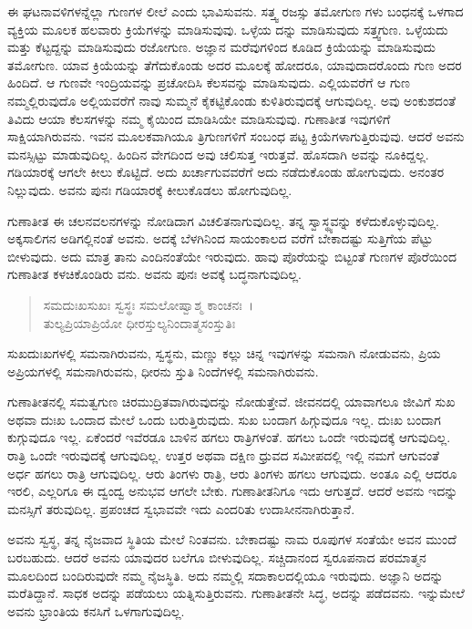 ಈ ಘಟನಾವಳಿಗಳನ್ನೆಲ್ಲಾ ಗುಣಗಳ ಲೀಲೆ ಎಂದು ಭಾವಿಸುವನು. ಸತ್ತ್ವ ರಜಸ್ಸು ತಮೋಗುಣ ಗಳು ಬಂಧನಕ್ಕೆ ಒಳಗಾದ ವ್ಯಕ್ತಿಯ ಮೂಲಕ ಹಲವಾರು ಕ್ರಿಯೆಗಳನ್ನು ಮಾಡಿಸುವುವು. ಒಳ್ಳೆಯ ದನ್ನು ಮಾಡಿಸುವುದು ಸತ್ತ್ವಗುಣ. ಒಳ್ಳೆಯದು ಮತ್ತು ಕೆಟ್ಟದ್ದನ್ನು ಮಾಡಿಸುವುದು ರಜೋಗುಣ. ಅಜ್ಞಾನ ಮರೆವುಗಳಿಂದ ಕೂಡಿದ ಕ್ರಿಯೆಯನ್ನು ಮಾಡಿಸುವುದು ತಮೋಗುಣ. ಯಾವ ಕ್ರಿಯೆಯನ್ನು ತೆಗೆದುಕೊಂಡು ಅದರ ಮೂಲಕ್ಕೆ ಹೋದರೂ, ಯಾವುದಾದರೊಂದು ಗುಣ ಅದರ ಹಿಂದಿದೆ. ಆ ಗುಣವೇ ಇಂದ್ರಿಯವನ್ನು ಪ್ರಚೋದಿಸಿ ಕೆಲಸವನ್ನು ಮಾಡಿಸುವುದು. ಎಲ್ಲಿಯವರೆಗೆ ಆ ಗುಣ ನಮ್ಮಲ್ಲಿರುವುದೊ ಅಲ್ಲಿಯವರೆಗೆ ನಾವು ಸುಮ್ಮನೆ ಕೈಕಟ್ಟಿಕೊಂಡು ಕುಳಿತಿರುವುದಕ್ಕೆ ಆಗುವುದಿಲ್ಲ. ಅವು ಅಂಕುಶದಂತೆ ತಿವಿದು ಆಯಾ ಕೆಲಸಗಳನ್ನು ನಮ್ಮ ಕೈಯಿಂದ ಮಾಡಿಸಿಯೇ ಮಾಡಿಸುವುವು. ಗುಣಾತೀತ ಇವುಗಳಿಗೆ ಸಾಕ್ಷಿಯಾಗಿರುವನು. ಇವನ ಮೂಲಕವಾಗಿಯೂ ತ್ರಿಗುಣಗಳಿಗೆ ಸಂಬಂಧ ಪಟ್ಟ ಕ್ರಿಯೆಗಳಾಗುತ್ತಿರುವುವು. ಆದರೆ ಅವನು ಮನಸ್ಸಿಟ್ಟು ಮಾಡುವುದಿಲ್ಲ. ಹಿಂದಿನ ವೇಗದಿಂದ ಅವು ಚಲಿಸುತ್ತ ಇರುತ್ತವೆ. ಹೊಸದಾಗಿ ಅವನ್ನು ನೂಕಿದ್ದಲ್ಲ. ಗಡಿಯಾರಕ್ಕೆ ಆಗಲೇ ಕೀಲು ಕೊಟ್ಟಿದೆ. ಅದು ಖರ್ಚಾಗುವವರೆಗೆ ಅದು ನಡೆದುಕೊಂಡು ಹೋಗುವುದು. ಅನಂತರ ನಿಲ್ಲುವುದು. ಅವನು ಪುನಃ ಗಡಿಯಾರಕ್ಕೆ ಕೀಲುಕೊಡಲು ಹೋಗುವುದಿಲ್ಲ.

ಗುಣಾತೀತ ಈ ಚಲನವಲನಗಳನ್ನು ನೋಡಿದಾಗ ವಿಚಲಿತನಾಗುವುದಿಲ್ಲ. ತನ್ನ ಸ್ವಾಸ್ಥ್ಯವನ್ನು ಕಳೆದುಕೊಳ್ಳುವುದಿಲ್ಲ. ಅಕ್ಕಸಾಲಿಗನ ಅಡಿಗಲ್ಲಿನಂತೆ ಅವನು. ಅದಕ್ಕೆ ಬೆಳಗಿನಿಂದ ಸಾಯಂಕಾಲದ ವರೆಗೆ ಬೇಕಾದಷ್ಟು ಸುತ್ತಿಗೆಯ ಪೆಟ್ಟು ಬೀಳುವುದು. ಅದು ಮಾತ್ರ ತಾನು ಎಂದಿನಂತೆಯೇ ಇರುವುದು. ಹಾವು ಪೊರೆಯನ್ನು ಬಿಟ್ಟಂತೆ ಗುಣಗಳ ಪೊರೆಯಿಂದ ಗುಣಾತೀತ ಕಳಚಿಕೊಂಡಿರು ವನು. ಅವನು ಪುನಃ ಅವಕ್ಕೆ ಬದ್ಧನಾಗುವುದಿಲ್ಲ.

\begin{verse}
ಸಮದುಃಖಸುಖಃ ಸ್ವಸ್ಥಃ ಸಮಲೋಷ್ವಾಶ್ಮ ಕಾಂಚನಃ~।\\ತುಲ್ಯಪ್ರಿಯಾಪ್ರಿಯೋ ಧೀರಸ್ತುಲ್ಯನಿಂದಾತ್ಮಸಂಸ್ತುತಿಃ 
\end{verse}

{\small ಸುಖದುಃಖಗಳಲ್ಲಿ ಸಮನಾಗಿರುವನು, ಸ್ವಸ್ಥನು, ಮಣ್ಣು ಕಲ್ಲು ಚಿನ್ನ ಇವುಗಳನ್ನು ಸಮನಾಗಿ ನೋಡುವನು, ಪ್ರಿಯ ಅಪ್ರಿಯಗಳಲ್ಲಿ ಸಮನಾಗಿರುವನು, ಧೀರನು ಸ್ತುತಿ ನಿಂದೆಗಳಲ್ಲಿ ಸಮನಾಗಿರುವನು.}

ಗುಣಾತೀತನಲ್ಲಿ ಸಮತ್ವಗುಣ ಚಿರಮುದ್ರಿತವಾಗಿರುವುದನ್ನು ನೋಡುತ್ತೇವೆ. ಜೀವನದಲ್ಲಿ ಯಾವಾಗಲೂ ಜೀವಿಗೆ ಸುಖ ಅಥವಾ ದುಃಖ ಒಂದಾದ ಮೇಲೆ ಒಂದು ಬರುತ್ತಿರುವುದು. ಸುಖ ಬಂದಾಗ ಹಿಗ್ಗುವುದೂ ಇಲ್ಲ. ದುಃಖ ಬಂದಾಗ ಕುಗ್ಗುವುದೂ ಇಲ್ಲ. ಏಕೆಂದರೆ ಇವೆರಡೂ ಬಾಳಿನ ಹಗಲು ರಾತ್ರಿಗಳಂತೆ. ಹಗಲು ಒಂದೇ ಇರುವುದಕ್ಕೆ ಆಗುವುದಿಲ್ಲ. ರಾತ್ರಿ ಒಂದೇ ಇರುವುದಕ್ಕೆ ಆಗುವುದಿಲ್ಲ. ಉತ್ತರ ಅಥವಾ ದಕ್ಷಿಣ ಧ್ರುವದ ಸಮೀಪದಲ್ಲಿ ಇಲ್ಲಿ ನಮಗೆ ಆಗುವಂತೆ ಅರ್ಧ ಹಗಲು ರಾತ್ರಿ ಆಗುವುದಿಲ್ಲ. ಆರು ತಿಂಗಳು ರಾತ್ರಿ, ಆರು ತಿಂಗಳು ಹಗಲು ಆಗುವುದು. ಅಂತೂ ಎಲ್ಲಿ ಆದರೂ ಇರಲಿ, ಎಲ್ಲರಿಗೂ ಈ ದ್ವಂದ್ವ ಅನುಭವ ಆಗಲೇ ಬೇಕು. ಗುಣಾತೀತನಿಗೂ ಇದು ಆಗುತ್ತದೆ. ಆದರೆ ಅವನು ಇದನ್ನು ಮನಸ್ಸಿಗೆ ತರುವುದಿಲ್ಲ. ಪ್ರಪಂಚದ ಸ್ವಭಾವವೇ ಇದು ಎಂದರಿತು ಉದಾಸೀನನಾಗಿರುತ್ತಾನೆ.

ಅವನು ಸ್ವಸ್ಥ, ತನ್ನ ನೈಜವಾದ ಸ್ಥಿತಿಯ ಮೇಲೆ ನಿಂತವನು. ಬೇಕಾದಷ್ಟು ನಾಮ ರೂಪುಗಳ ಸಂತೆಯೇ ಅವನ ಮುಂದೆ ಬರಬಹುದು. ಆದರೆ ಅವನು ಯಾವುದರ ಬಲೆಗೂ ಬೀಳುವುದಿಲ್ಲ. ಸಚ್ಚಿದಾನಂದ ಸ್ವರೂಪನಾದ ಪರಮಾತ್ಮನ ಮೂಲದಿಂದ ಬಂದಿರುವುದೇ ನಮ್ಮ ನೈಜಸ್ಥಿತಿ. ಅದು ನಮ್ಮಲ್ಲಿ ಸದಾಕಾಲದಲ್ಲಿಯೂ ಇರುವುದು. ಅಜ್ಞಾನಿ ಅದನ್ನು ಮರೆತಿದ್ದಾನೆ. ಸಾಧಕ ಅದನ್ನು ಪಡೆಯಲು ಯತ್ನಿಸುತ್ತಿರುವನು. ಗುಣಾತೀತನೇ ಸಿದ್ಧ, ಅದನ್ನು ಪಡೆದವನು. ಇನ್ನುಮೇಲೆ ಅವನು ಭ್ರಾಂತಿಯ ಕನಸಿಗೆ ಒಳಗಾಗುವುದಿಲ್ಲ.

